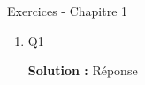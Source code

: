 \documentclass[letter, 11pt]{article}
\newcommand{\prof}[1]{\begin{professeur}\color{blue} {\bf Solution :} #1 \end{professeur}}
\begin{document}
\vspace*{0.01 cm}
\begin{center}
{\Large Exercices - Chapitre 1}
\end{center}



\begin{enumerate}[leftmargin=*, wide, label=\bf Exercice \arabic*:]

\item Q1

\prof{Réponse}


\end{enumerate}
\end{document}
